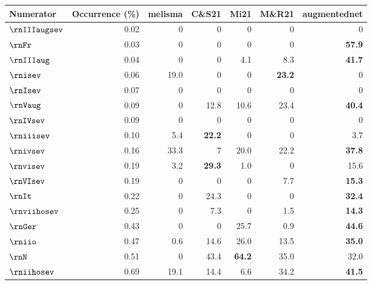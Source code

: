 \begin{tabular}{lr|rrrrr}
Numerator & Occurrence (\%) & \gls{melisma}  & C\&S21        & Mi21          & M\&R21        & \gls{augmentednet}        \\ \hline
$\rnIIIaugsev$     & 0.02       & 0    & 0             & 0             & 0             & 0             \\
$\rnFr$       & 0.03       & 0    & 0             & 0             & 0             & \textbf{57.9} \\
$\rnIIIaug$      & 0.04       & 0    & 0             & 4.1           & 8.3           & \textbf{41.7} \\
$\rnisev$        & 0.06       & 19.0 & 0             & 0             & \textbf{23.2} & 0             \\
$\rnIsev$        & 0.07       & 0    & 0             & 0             & 0             & 0             \\
$\rnVaug$        & 0.09       & 0    & 12.8          & 10.6          & 23.4          & \textbf{40.4} \\
$\rnIVsev$       & 0.09       & 0    & 0             & 0             & 0             & 0             \\
$\rniiisev$      & 0.10       & 5.4  & \textbf{22.2} & 0             & 0             & 3.7           \\
$\rnivsev$       & 0.16       & 33.3 & 7             & 20.0          & 22.2          & \textbf{37.8} \\
$\rnvisev$       & 0.19       & 3.2  & \textbf{29.3} & 1.0           & 0             & 15.6          \\
$\rnVIsev$       & 0.19       & 0    & 0             & 0             & 7.7           & \textbf{15.3} \\
$\rnIt$        & 0.22       & 0    & 24.3          & 0             & 0             & \textbf{32.4} \\
$\rnviihosev$     & 0.25       & 0    & 7.3           & 0             & 1.5           & \textbf{14.3} \\
$\rnGer$      & 0.43       & 0    & 0             & 25.7          & 0.9           & \textbf{44.6} \\
$\rniio$       & 0.47       & 0.6  & 14.6          & 26.0          & 13.5          & \textbf{35.0} \\
$\rnN$         & 0.51       & 0    & 43.4          & \textbf{64.2} & 35.0          & 32.0          \\
$\rniihosev$      & 0.69       & 19.1 & 14.4          & 6.6           & 34.2          & \textbf{41.5} \\

\end{tabular}
